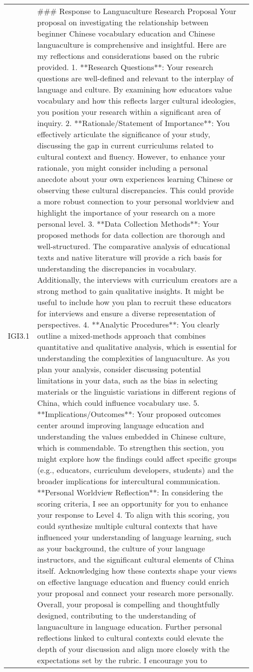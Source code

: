 \begin{longtable}{|p{}|p{}|p{}|}
IGI3.1 & \#\#\# Response to Languaculture Research Proposal  Your proposal on investigating the relationship between beginner Chinese vocabulary education and Chinese languaculture is comprehensive and insightful. Here are my reflections and considerations based on the rubric provided.  1. **Research Questions**: Your research questions are well-defined and relevant to the interplay of language and culture. By examining how educators value vocabulary and how this reflects larger cultural ideologies, you position your research within a significant area of inquiry.   2. **Rationale/Statement of Importance**: You effectively articulate the significance of your study, discussing the gap in current curriculums related to cultural context and fluency. However, to enhance your rationale, you might consider including a personal anecdote about your own experiences learning Chinese or observing these cultural discrepancies. This could provide a more robust connection to your personal worldview and highlight the importance of your research on a more personal level.  3. **Data Collection Methods**: Your proposed methods for data collection are thorough and well-structured. The comparative analysis of educational texts and native literature will provide a rich basis for understanding the discrepancies in vocabulary. Additionally, the interviews with curriculum creators are a strong method to gain qualitative insights. It might be useful to include how you plan to recruit these educators for interviews and ensure a diverse representation of perspectives.  4. **Analytic Procedures**: You clearly outline a mixed-methods approach that combines quantitative and qualitative analysis, which is essential for understanding the complexities of languaculture. As you plan your analysis, consider discussing potential limitations in your data, such as the bias in selecting materials or the linguistic variations in different regions of China, which could influence vocabulary use.  5. **Implications/Outcomes**: Your proposed outcomes center around improving language education and understanding the values embedded in Chinese culture, which is commendable. To strengthen this section, you might explore how the findings could affect specific groups (e.g., educators, curriculum developers, students) and the broader implications for intercultural communication.  **Personal Worldview Reflection**: In considering the scoring criteria, I see an opportunity for you to enhance your response to Level 4. To align with this scoring, you could synthesize multiple cultural contexts that have influenced your understanding of language learning, such as your background, the culture of your language instructors, and the significant cultural elements of China itself. Acknowledging how these contexts shape your views on effective language education and fluency could enrich your proposal and connect your research more personally.  Overall, your proposal is compelling and thoughtfully designed, contributing to the understanding of languaculture in language education. Further personal reflections linked to cultural contexts could elevate the depth of your discussion and align more closely with the expectations set by the rubric. I encourage you to 
\end{longtable}
